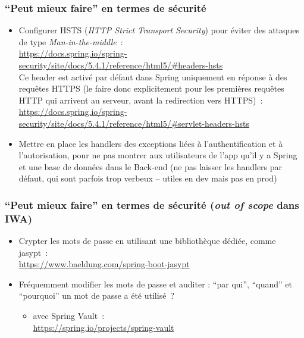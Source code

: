 \documentclass{beamer}
\begin{document}
\begin{frame}[fragile]
	\frametitle{``Peut mieux faire'' en termes de sécurité}
	\begin{itemize}
		\item Configurer HSTS (\textit{HTTP Strict Transport Security}) pour éviter des attaques de type \textit{Man-in-the-middle}~:\\
		\footnotesize
		\url{https://docs.spring.io/spring-security/site/docs/5.4.1/reference/html5/#headers-hsts}\\
		\normalsize
		Ce header est activé par défaut dans Spring uniquement en réponse à des requêtes HTTPS (le faire donc explicitement pour les premières requêtes HTTP qui arrivent au serveur, avant la redirection vers HTTPS)~:\\
		\footnotesize
		\url{https://docs.spring.io/spring-security/site/docs/5.4.1/reference/html5/#servlet-headers-hsts}
		\normalsize
		\item Mettre en place les handlers des exceptions liées à l'authentification et à l'autorisation, pour ne pas montrer aux utilisateurs de l'app  qu'il y a Spring et une base de données dans le Back-end
		\footnotesize
		 (ne pas laisser les handlers par défaut, qui sont parfois trop verbeux -- utiles en dev mais pas en prod)
		 \normalsize
	\end{itemize}
\end{frame}

\begin{frame}[fragile]
\frametitle{``Peut mieux faire'' en termes de sécurité (\textit{out of scope} dans IWA)}		
\begin{itemize}

		\item Crypter les mots de passe en utilisant une bibliothèque dédiée, comme jasypt~:\\
		\footnotesize
		\url{https://www.baeldung.com/spring-boot-jasypt}
		\normalsize
		\item Fréquemment modifier les mots de passe et auditer : ``par qui'', ``quand'' et ``pourquoi'' un mot de passe a été utilisé~?
		\begin{itemize}
			\item avec Spring Vault~: \\
			\footnotesize
			\url{https://spring.io/projects/spring-vault}
			\normalsize
		\end{itemize}
		
	\end{itemize}
\end{frame}
\end{document}
